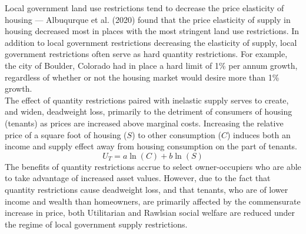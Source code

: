 \documentclass[12pt]{extarticle}
\begin{document}
  Local government land use restrictions tend to decrease the price elasticity of housing --- Albuqurque et al. (2020) found that the price elasticity of supply in housing decreased most in places with the most stringent land use restrictions. In addition to local government restrictions decreasing the elasticity of supply, local government restrictions often serve as hard quantity restrictions. For example, the city of Boulder, Colorado had in place a hard limit of 1\% per annum growth, regardless of whether or not the housing market would desire more than 1\% growth.\\

  The effect of quantity restrictions paired with inelastic supply serves to create, and widen, deadweight loss, primarily to the detriment of consumers of housing (tenants) as prices are increased above marginal costs. Increasing the relative price of a square foot of housing ($S$) to other consumption ($C$) induces both an income and supply effect away from housing consumption on the part of tenants.
  \[U_{T} = a\ln(C) + b\ln(S)\]
  The benefits of quantity restrictions accrue to select owner-occupiers who are able to take advantage of increased asset values. However, due to the fact that quantity restrictions cause deadweight loss, and that tenants, who are of lower income and wealth than homeowners, are primarily affected by the commensurate increase in price, both Utilitarian and Rawlsian social welfare are reduced under the regime of local government supply restrictions.
\end{document}
